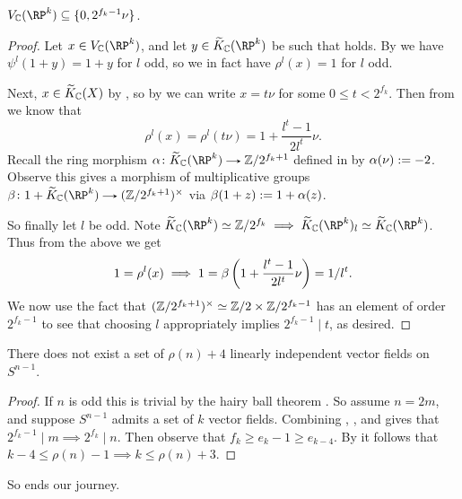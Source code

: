 \begin{lemma}
  \label{RP-jprime}
  $V_\C(\RP^k) \subseteq \{0,2^{f_k-1}\nu\}$.
\end{lemma}

\begin{proof}
  Let $x \in V_\C(\RP^k)$, and let $y \in \til K_\C(\RP^k)$ be such
  that  holds. By  we have $\psi^l(1+y) =
  1+y$ for $l$ odd, so we in fact have $\rho^l(x) = 1$ for $l$ odd.

  Next, $x \in \widetilde K_{\mathbb{C}}(X)$ by , so by 
  we can write $x = t\nu$ for some $0 \le t < 2^{f_k}$. Then from
   we know that
  \[
  \rho^l(x) = \rho^l(t\nu) = 1 + \frac{l^t-1}{2l^t}\nu.
  \]
  Recall the ring morphism $\alpha \c \til K_\C(\RP^k) \to
  \Z/2^{f_k+1}$ defined in  by $\alpha(\nu) \mathrel{:=}
  -2$. Observe this gives a morphism of multiplicative groups $\beta
  \c 1 + \til K_\C(\RP^k) \to (\Z/2^{f_k+1})^\times$ via $\beta(1+z)
  \mathrel{:=} 1+\alpha(z)$.

  So finally let $l$ be odd. Note $\til K_\C(\RP^k) \simeq \Z/2^{f_k}
  \implies \til K_\C(\RP^k)_l \simeq \til K_\C(\RP^k)$. Thus from the
  above we get
  \[
  1 = \rho^l(x) \implies 1 = \beta\left(1 + \frac{l^t-1}{2l^t}\nu\right) =
  1/l^t.
  \]
  We now use the fact that $(\mathbb{Z}/2^{f_k+1})^\times \simeq \mathbb{Z}/2 \times
  \mathbb{Z}/2^{f_k-1}$ has an element of order $2^{f_k-1}$ to see that
  choosing $l$ appropriately implies $2^{f_k-1} \mid t$, as desired.
\end{proof}

\begin{theorem}
  \label{complex-upper}
  There does not exist a set of $\rho(n) + 4$ linearly independent
  vector fields on $S^{n-1}$.
\end{theorem}

\begin{proof}
  If $n$ is odd this is trivial by the hairy ball theorem
  . So assume $n = 2m$, and suppose $S^{n-1}$ admits
  a set of $k$ vector fields. Combining ,
  , and  gives that $2^{f_k-1} \mid
  m \implies 2^{f_k} \mid n$. Then observe that $f_k \ge e_k - 1 \ge
  e_{k-4}$. By  it follows that $k-4 \le \rho(n) - 1
  \implies k \le \rho(n) + 3$.
\end{proof}

So ends our journey.

